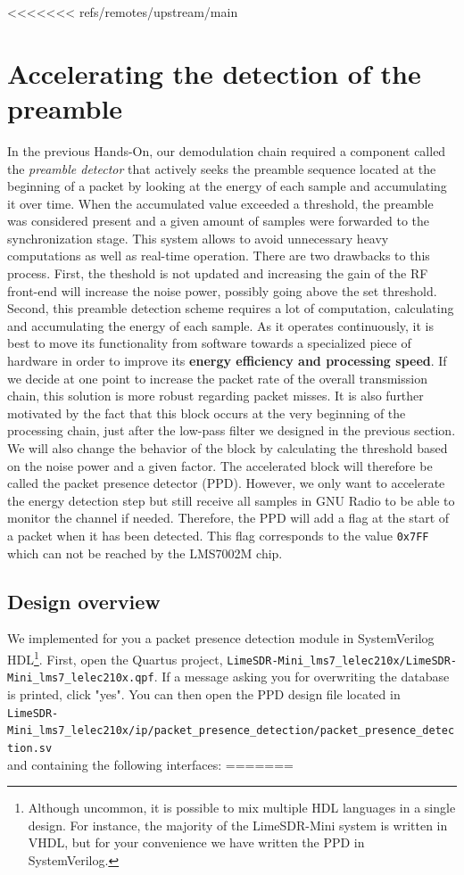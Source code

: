 <<<<<<< refs/remotes/upstream/main
\section{Accelerating the detection of the preamble}
In the previous Hands-On, our demodulation chain required a component called the \textit{preamble detector} that actively seeks the preamble sequence located at the beginning of a packet by looking at the energy of each sample and accumulating it over time. When the accumulated value exceeded a threshold, the preamble was considered present and a given amount of samples were forwarded to the synchronization stage. This system allows to avoid unnecessary heavy computations as well as real-time operation. There are two drawbacks to this process. First, the theshold is not updated and increasing the gain of the RF front-end will increase the noise power, possibly going above the set threshold. Second, this preamble detection scheme requires a lot of computation, calculating and accumulating the energy of each sample. As it operates continuously, it is best to move its functionality from software towards a specialized piece of hardware in order to improve its \textbf{energy efficiency and processing speed}. If we decide at one point to increase the packet rate of the overall transmission chain, this solution is more robust regarding packet misses. It is also further motivated by the fact that this block occurs at the very beginning of the processing chain, just after the low-pass filter we designed in the previous section. We will also change the behavior of the block by calculating the threshold based on the noise power and a given factor. The accelerated block will therefore be called the packet presence detector (PPD). However, we only want to accelerate the energy detection step but still receive all samples in GNU Radio to be able to monitor the channel if needed. Therefore, the PPD will add a flag at the start of a packet when it has been detected. This flag corresponds to the value \texttt{0x7FF} which can not be reached by the LMS7002M chip.


\subsection{Design overview}
We implemented for you a packet presence detection module in SystemVerilog HDL\footnote{Although uncommon, it is possible to mix multiple HDL languages in a single design. For instance, the majority of the LimeSDR-Mini system is written in VHDL, but for your convenience we have written the PPD in SystemVerilog.}. First, open the Quartus project, \texttt{LimeSDR-Mini\_lms7\_lelec210x/LimeSDR-Mini\_lms7\_lelec210x.qpf}. If a message asking you for overwriting the database is printed, click "yes". You can then open the PPD design file located in\\ \texttt{LimeSDR-Mini\_lms7\_lelec210x/ip/packet\_presence\_detection/packet\_presence\_detection.sv}\\ and containing the following interfaces:
=======
